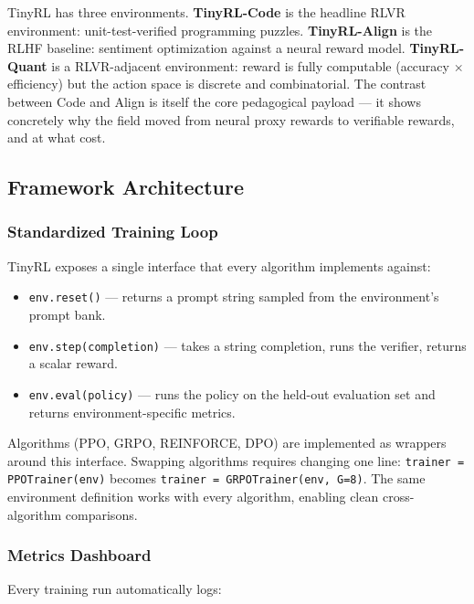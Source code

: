 TinyRL has three environments. \textbf{TinyRL-Code} is the headline RLVR environment: unit-test-verified programming puzzles. \textbf{TinyRL-Align} is the RLHF baseline: sentiment optimization against a neural reward model. \textbf{TinyRL-Quant} is a RLVR-adjacent environment: reward is fully computable (accuracy $\times$ efficiency) but the action space is discrete and combinatorial. The contrast between Code and Align is itself the core pedagogical payload --- it shows concretely why the field moved from neural proxy rewards to verifiable rewards, and at what cost.

\subsection{Framework Architecture}

\subsubsection{Standardized Training Loop}

TinyRL exposes a single interface that every algorithm implements against:

\begin{itemize}
  \item \texttt{env.reset()} --- returns a prompt string sampled from the environment's prompt bank.
  \item \texttt{env.step(completion)} --- takes a string completion, runs the verifier, returns a scalar reward.
  \item \texttt{env.eval(policy)} --- runs the policy on the held-out evaluation set and returns environment-specific metrics.
\end{itemize}

Algorithms (PPO, GRPO, REINFORCE, DPO) are implemented as wrappers around this interface. Swapping algorithms requires changing one line: \texttt{trainer = PPOTrainer(env)} becomes \texttt{trainer = GRPOTrainer(env, G=8)}. The same environment definition works with every algorithm, enabling clean cross-algorithm comparisons.

\subsubsection{Metrics Dashboard}

Every training run automatically logs:

